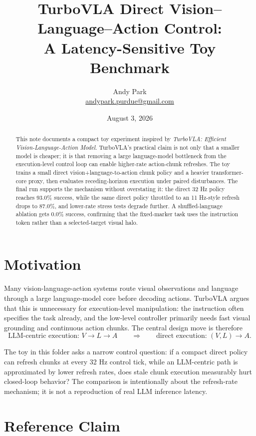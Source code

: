 \documentclass[11pt]{article}
\title{TurboVLA Direct Vision--Language--Action Control:\\A Latency-Sensitive Toy Benchmark}
\author{Andy Park\\\href{mailto:andypark.purdue@gmail.com}{andypark.purdue@gmail.com}}
\date{August 3, 2026}
\begin{document}
\maketitle

\begin{abstract}
This note documents a compact toy experiment inspired by \emph{TurboVLA: Efficient Vision-Language-Action Model}. TurboVLA's practical claim is not only that a smaller model is cheaper; it is that removing a large language-model bottleneck from the execution-level control loop can enable higher-rate action-chunk refreshes. The toy trains a small direct vision+language-to-action chunk policy and a heavier transformer-core proxy, then evaluates receding-horizon execution under paired disturbances. The final run supports the mechanism without overstating it: the direct 32 Hz policy reaches 93.0\% success, while the same direct policy throttled to an 11 Hz-style refresh drops to 87.0\%, and lower-rate stress tests degrade further. A shuffled-language ablation gets 0.0\% success, confirming that the fixed-marker task uses the instruction token rather than a selected-target visual halo.
\end{abstract}

\section{Motivation}

Many vision-language-action systems route visual observations and language through a large language-model core before decoding actions. TurboVLA argues that this is unnecessary for execution-level manipulation: the instruction often specifies the task already, and the low-level controller primarily needs fast visual grounding and continuous action chunks. The central design move is therefore
\[
  \text{LLM-centric execution: } V \rightarrow L \rightarrow A
  \qquad \Longrightarrow \qquad
  \text{direct execution: } (V,L) \rightarrow A.
\]

The toy in this folder asks a narrow control question: if a compact direct policy can refresh chunks at every 32 Hz control tick, while an LLM-centric path is approximated by lower refresh rates, does stale chunk execution measurably hurt closed-loop behavior? The comparison is intentionally about the refresh-rate mechanism; it is not a reproduction of real LLM inference latency.

\section{Reference Claim}
\end{document}
